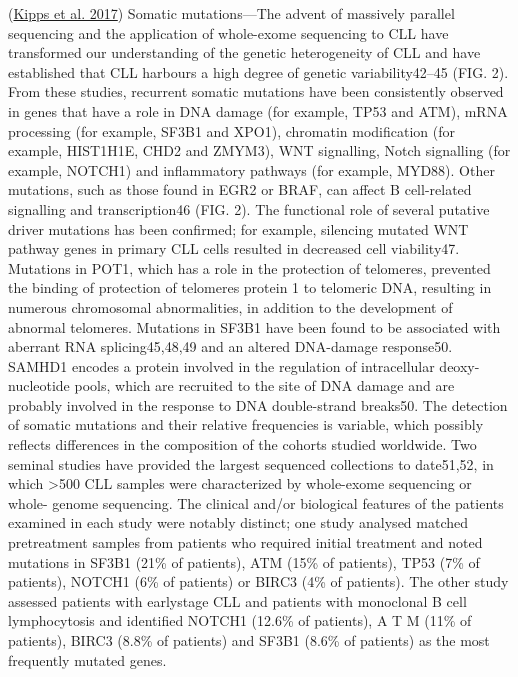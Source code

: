 \documentclass[11pt, a4paper, twosided]{book}
\begin{document}
(\protect\hyperlink{ref-Kipps2017}{Kipps et al. 2017})
Somatic mutations---The advent of massively parallel sequencing and the application of whole-exome sequencing to CLL have transformed our understanding of the genetic heterogeneity of CLL and have established that CLL harbours a high degree of genetic variability42--45 (FIG. 2). From these studies, recurrent somatic mutations have been consistently observed in genes that have a role in DNA damage (for example, TP53 and ATM), mRNA processing (for example, SF3B1 and XPO1), chromatin modification (for example, HIST1H1E, CHD2 and ZMYM3), WNT signalling, Notch signalling (for example, NOTCH1) and inflammatory pathways (for example, MYD88). Other mutations, such as those found in EGR2 or BRAF, can affect B cell-related signalling and transcription46 (FIG. 2).
The functional role of several putative driver mutations has been confirmed; for example, silencing mutated WNT pathway genes in primary CLL cells resulted in decreased cell viability47. Mutations in POT1, which has a role in the protection of telomeres, prevented the binding of protection of telomeres protein 1 to telomeric DNA, resulting in numerous chromosomal abnormalities, in addition to the development of abnormal telomeres. Mutations in SF3B1 have been found to be associated with aberrant RNA splicing45,48,49 and an altered DNA-damage response50. SAMHD1 encodes a protein involved in the regulation of intracellular deoxy-nucleotide pools, which are recruited to the site of DNA damage and are probably involved in the response to DNA double-strand breaks50.
The detection of somatic mutations and their relative frequencies is variable, which possibly reflects differences in the composition of the cohorts studied worldwide. Two seminal studies have provided the largest sequenced collections to date51,52, in which \textgreater500 CLL samples were characterized by whole-exome sequencing or whole- genome sequencing. The clinical and/or biological features of the patients examined in each study were notably distinct; one study analysed matched pretreatment samples from patients who required initial treatment and noted mutations in SF3B1 (21\% of patients), ATM (15\% of patients), TP53 (7\% of patients), NOTCH1 (6\% of patients) or BIRC3 (4\% of patients). The other study assessed patients with earlystage CLL and patients with monoclonal B cell lymphocytosis and identified NOTCH1 (12.6\% of patients), A T M (11\% of patients), BIRC3 (8.8\% of patients) and SF3B1 (8.6\% of patients) as the most frequently mutated genes.
\end{document}
